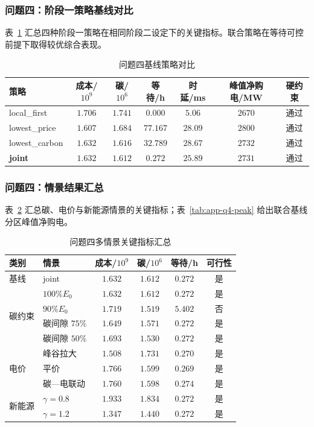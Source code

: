 \documentclass[UTF8,a4paper,zihao=-4]{ctexart}
\begin{document}
\subsubsection{问题四：阶段一策略基线对比}

表~\ref{tab:app-q4-baseline} 汇总四种阶段一策略在相同阶段二设定下的关键指标。联合策略在等待可控前提下取得较优综合表现。

\begin{table}[H]
\centering
\footnotesize
\caption{问题四基线策略对比}
\label{tab:app-q4-baseline}
\setlength{\tabcolsep}{3pt}
\begin{tabular}{lcccccc}
\toprule
策略 & 成本/$10^9$ & 碳/$10^6$ & 等待/h & 时延/ms & 峰值净购电/MW & 硬约束 \\
\midrule
local\_first & $1.706$ & $1.741$ & $0.000$ & $5.06$ & $2670$ & 通过 \\
lowest\_price & $1.607$ & $1.684$ & $77.167$ & $28.09$ & $2800$ & 通过 \\
lowest\_carbon & $1.632$ & $1.616$ & $32.789$ & $28.67$ & $2732$ & 通过 \\
\textbf{joint} & $\mathbf{1.632}$ & $\mathbf{1.612}$ & $\mathbf{0.272}$ & $25.89$ & $2731$ & 通过 \\
\bottomrule
\end{tabular}
\end{table}

\subsubsection{问题四：情景结果汇总}

表~\ref{tab:app-q4-scenarios} 汇总碳、电价与新能源情景的关键指标；表~\ref{tab:app-q4-peak} 给出联合基线分区峰值净购电。

\begin{table}[H]
\centering
\footnotesize
\caption{问题四多情景关键指标汇总}
\label{tab:app-q4-scenarios}
\setlength{\tabcolsep}{3pt}
\begin{tabular}{llcccc}
\toprule
类别 & 情景 & 成本/$10^9$ & 碳/$10^6$ & 等待/h & 可行性 \\
\midrule
基线 & joint & $1.632$ & $1.612$ & $0.272$ & 是 \\
\midrule
\multirow{4}{*}{碳约束}
 & $100\%E_0$ & $1.632$ & $1.612$ & $0.272$ & 是 \\
 & $90\%E_0$ & $1.719$ & $1.519$ & $5.402$ & 否 \\
 & 碳间隙 $75\%$ & $1.649$ & $1.571$ & $0.272$ & 是 \\
 & 碳间隙 $50\%$ & $1.693$ & $1.530$ & $0.272$ & 是 \\
\midrule
\multirow{3}{*}{电价}
 & 峰谷拉大 & $1.508$ & $1.731$ & $0.270$ & 是 \\
 & 平价 & $1.766$ & $1.599$ & $0.269$ & 是 \\
 & 碳—电联动 & $1.760$ & $1.598$ & $0.274$ & 是 \\
\midrule
\multirow{2}{*}{新能源}
 & $\gamma=0.8$ & $1.933$ & $1.834$ & $0.272$ & 是 \\
 & $\gamma=1.2$ & $1.347$ & $1.440$ & $0.272$ & 是 \\
\bottomrule
\end{tabular}
\end{table}
\end{document}
